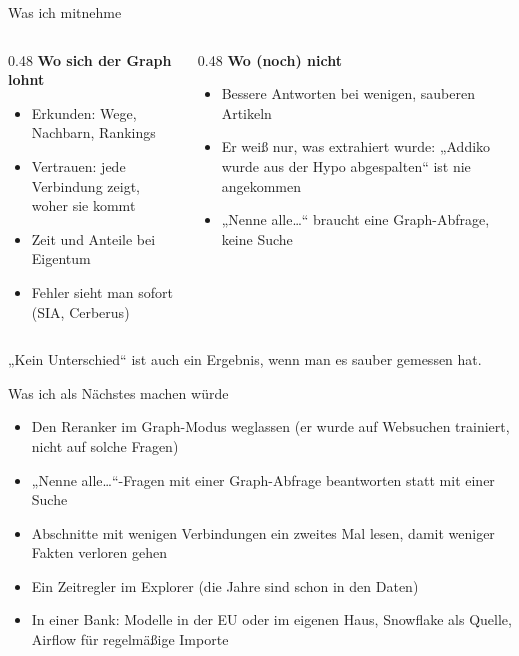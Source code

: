\documentclass[aspectratio=169,11pt]{beamer}
\newcommand{\hl}[1]{\textcolor{midblue}{\textbf{#1}}}
\begin{document}
\begin{frame}{Was ich mitnehme}
  \begin{columns}[T]
    \begin{column}{0.48\textwidth}
      \hl{Wo sich der Graph lohnt}
      \begin{itemize}\small
        \item Erkunden: Wege, Nachbarn, Rankings
        \item Vertrauen: jede Verbindung zeigt, woher sie kommt
        \item Zeit und Anteile bei Eigentum
        \item Fehler sieht man sofort (SIA, Cerberus)
      \end{itemize}
    \end{column}
    \begin{column}{0.48\textwidth}
      \hl{Wo (noch) nicht}
      \begin{itemize}\small
        \item Bessere Antworten bei wenigen, sauberen Artikeln
        \item Er weiß nur, was extrahiert wurde: „Addiko wurde aus der Hypo abgespalten“ ist nie angekommen
        \item „Nenne alle\ldots“ braucht eine Graph-Abfrage, keine Suche
      \end{itemize}
    \end{column}
  \end{columns}
  \vspace{10pt}
  \centering\small
  „Kein Unterschied“ ist auch ein Ergebnis, wenn man es sauber gemessen hat.
\end{frame}

\begin{frame}{Was ich als Nächstes machen würde}
  \begin{itemize}
    \item Den Reranker im Graph-Modus weglassen (er wurde auf Websuchen trainiert, nicht auf solche Fragen)
    \item „Nenne alle\ldots“-Fragen mit einer Graph-Abfrage beantworten statt mit einer Suche
    \item Abschnitte mit wenigen Verbindungen ein zweites Mal lesen, damit weniger Fakten verloren gehen
    \item Ein Zeitregler im Explorer (die Jahre sind schon in den Daten)
    \item In einer Bank: Modelle in der EU oder im eigenen Haus, Snowflake als Quelle,
          Airflow für regelmäßige Importe
  \end{itemize}
\end{frame}
\end{document}
